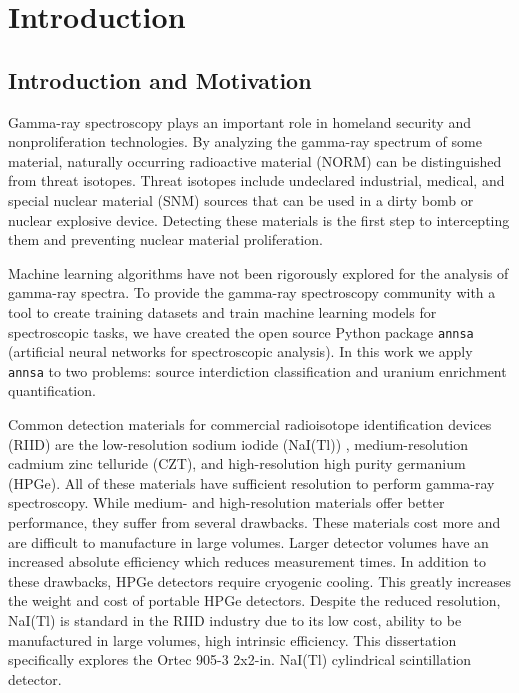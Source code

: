 \chapter{Introduction}

\section{Introduction and Motivation}

Gamma-ray spectroscopy plays an important role in homeland security and nonproliferation technologies. By analyzing the gamma-ray spectrum of some material, naturally occurring radioactive material (NORM) can be distinguished from threat isotopes. Threat isotopes include undeclared industrial, medical, and special nuclear material (SNM) sources that can be used in a dirty bomb or nuclear explosive device. Detecting these materials is the first step to intercepting them and preventing nuclear material proliferation.

Machine learning algorithms have not been rigorously explored for the analysis of gamma-ray spectra. To provide the gamma-ray spectroscopy community with a tool to create training datasets and train machine learning models for spectroscopic tasks, we have created the open source Python package \verb|annsa| (artificial neural networks for spectroscopic analysis). In this work we apply \verb|annsa| to two problems: source interdiction classification and uranium enrichment quantification.

Common detection materials for commercial radioisotope identification devices (RIID) are the low-resolution sodium iodide (NaI(Tl)) \cite{Hofstadter1948}, medium-resolution cadmium zinc telluride (CZT), and high-resolution high purity germanium (HPGe). All of these materials have sufficient resolution to perform gamma-ray spectroscopy. While medium- and high-resolution materials offer better performance, they suffer from several drawbacks. These materials cost more and are difficult to manufacture in large volumes. Larger detector volumes have an increased absolute efficiency which reduces measurement times. In addition to these drawbacks, HPGe detectors require cryogenic cooling. This greatly increases the weight and cost of portable HPGe detectors. Despite the reduced resolution, NaI(Tl) is standard in the RIID industry due to its low cost, ability to be manufactured in large volumes, high intrinsic efficiency. This dissertation specifically explores the Ortec 905-3 2x2-in. NaI(Tl) cylindrical scintillation detector.

